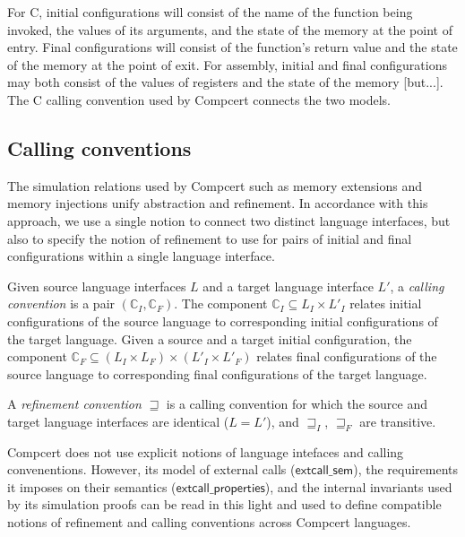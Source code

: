 \documentclass[sigplan,10pt,review,anonymous]{acmart}
\newcommand{\kw}[1]{\ensuremath{ \textsf{#1} }}
\begin{document}
For C,
initial configurations
will consist of the name of the function being invoked,
the values of its arguments,
and the state of the memory at the point of entry.
Final configurations
will consist of the function's return value
and the state of the memory at the point of exit.
For assembly,
initial and final configurations may both consist of
the values of registers and the state of the memory
[but...].
The C calling convention used by Compcert
connects the two models.


\subsection{Calling conventions} %

The simulation relations used by Compcert
such as memory extensions and memory injections
unify abstraction and refinement.
In accordance with this approach,
we use a single notion
to connect two distinct language interfaces,
but also to specify the notion of refinement to use
for pairs of initial and final configurations
within a single language interface.

\begin{definition}
Given source language interfaces $L$ and
a target language interface $L'$,
a \emph{calling convention} is a pair $(\mathbb{C}_I, \mathbb{C}_F)$.
The component
$\mathbb{C}_I \subseteq L_I \times L'_I$
relates initial configurations of the source language to
corresponding initial configurations of the target language.
Given a source and a target initial configuration,
the component
$\mathbb{C}_F \subseteq (L_I \times L_F) \times (L'_I \times L'_F)$
relates final configurations of the source language to
corresponding final configurations of the target language.

A \emph{refinement convention} $\sqsupseteq$
is a calling convention for which
the source and target language interfaces are identical ($L = L'$),
and $\sqsupseteq_I$, $\sqsupseteq_F$ are transitive.
\end{definition}

Compcert does not use explicit notions of
language intefaces and calling convenentions.
However,
its model of external calls
(\kw{extcall\_sem}),
the requirements it imposes on their semantics
(\kw{extcall\_properties}),
and the internal invariants used by its simulation proofs
can be read in this light
and used to define
compatible notions of refinement and calling conventions
across Compcert languages.
\end{document}
